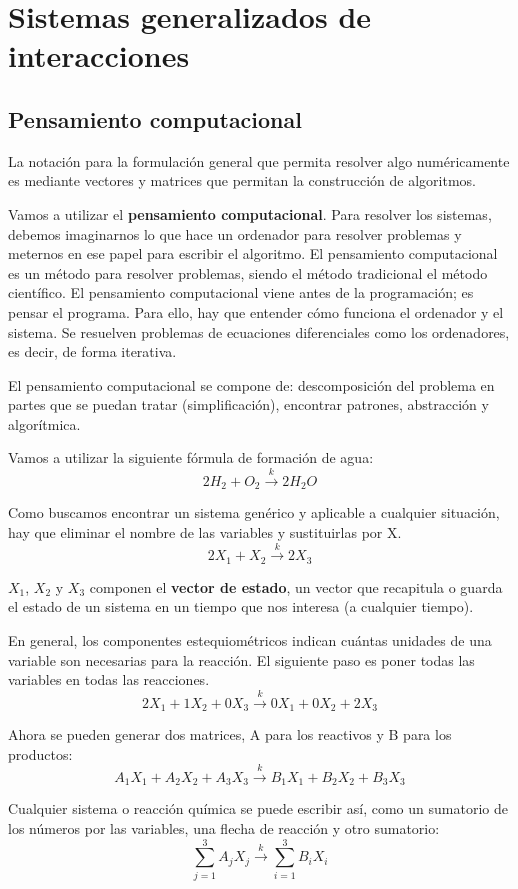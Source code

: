 \section{Sistemas generalizados de interacciones}
\subsection{Pensamiento computacional}
La notación para la formulación general que permita resolver algo numéricamente es mediante vectores y matrices que permitan la construcción de algoritmos. 

Vamos a utilizar el \textbf{pensamiento computacional}. Para resolver los sistemas, debemos imaginarnos lo que hace un ordenador para resolver problemas y meternos en ese papel para escribir el algoritmo. El pensamiento computacional es un método para resolver problemas, siendo el método tradicional el método científico. El pensamiento computacional viene antes de la programación; es pensar el programa. Para ello, hay que entender cómo funciona el ordenador y el sistema. Se resuelven problemas de ecuaciones diferenciales como los ordenadores, es decir, de forma iterativa. 

El pensamiento computacional se compone de: descomposición del problema en partes que se puedan tratar (simplificación), encontrar patrones, abstracción y algorítmica.

Vamos a utilizar la siguiente fórmula de formación de agua:
$$2H_2 + O_2 \xrightarrow{k} 2H_2O$$

Como buscamos encontrar un sistema genérico y aplicable a cualquier situación, hay que eliminar el nombre de las variables y sustituirlas por X. 
$$2X_1 + X_2 \xrightarrow{k} 2X_3$$

$X_1$, $X_2$ y $X_3$ componen el \textbf{vector de estado}, un vector que recapitula o guarda el estado de un sistema en un tiempo que nos interesa (a cualquier tiempo). 

En general, los componentes estequiométricos indican cuántas unidades de una variable son necesarias para la reacción. El siguiente paso es poner todas las variables en todas las reacciones.
$$2X_1 +1 X_2 + 0X_3 \xrightarrow{k} 0X_1 + 0X_2 + 2X_3$$

Ahora se pueden generar dos matrices, A para los reactivos y B para los productos:
$$A_1X_1 +A_2 X_2 + A_3X_3 \xrightarrow{k} B_1X_1 + B_2X_2 + B_3X_3$$

Cualquier sistema o reacción química se puede escribir así, como un sumatorio de los números por las variables, una flecha de reacción y otro sumatorio:
$$\sum^3_{j=1} A_jX_j \xrightarrow{k} \sum^3_{i=1} B_iX_i $$

